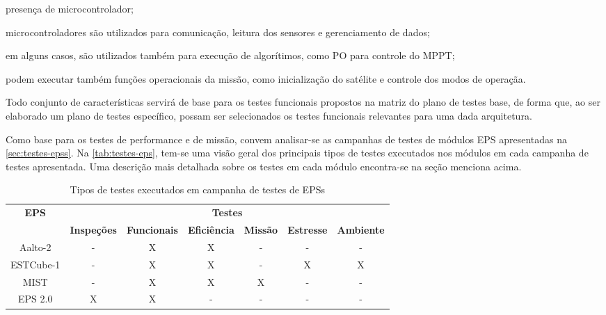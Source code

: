 \begin{alineas}
    \item presença de microcontrolador;
    \begin{alineas}
        \item microcontroladores são utilizados para comunicação, leitura dos sensores e gerenciamento de dados;
        \item em alguns casos, são utilizados também para execução de algorítimos, como \gls{PO} para controle do \gls{MPPT};
        \item podem executar também funções operacionais da missão, como inicialização do satélite e controle dos modos de operaçãa.
    \end{alineas}
\end{alineas}

Todo conjunto de características servirá de base para os testes funcionais propostos na matriz do plano de testes base, de forma que, ao ser elaborado um plano de testes específico, possam ser selecionados os testes funcionais relevantes para uma dada arquitetura.

Como base para os testes de performance e de missão, convem analisar-se as campanhas de testes de módulos \gls{EPS} apresentadas na \autoref{sec:testes-epss}.
Na \autoref{tab:testes-eps}, tem-se uma visão geral dos principais tipos de testes executados nos módulos em cada campanha de testes apresentada.
Uma descrição mais detalhada sobre os testes em cada módulo encontra-se na seção menciona acima.

\begin{table}[ht!]
    \ABNTEXfontereduzida
    \centering
    \caption{Tipos de testes executados em campanha de testes de EPSs}
    \begin{tabular}{ccccccc}
        \toprule
        \multirow{2}{*}{\textbf{EPS}} & \multicolumn{6}{c}{\textbf{Testes}} \\
        \cline{2-7}
        & \textbf{Inspeções} & \textbf{Funcionais} & \textbf{Eficiência} & \textbf{Missão} & \textbf{Estresse} & \textbf{Ambiente} \\
        \midrule
        \midrule
        Aalto-2   & - & X & X & - & - & - \\
        ESTCube-1 & - & X & X & - & X & X \\
        MIST      & - & X & X & X & - & - \\
        EPS 2.0   & X & X & - & - & - & - \\
        \bottomrule
    \end{tabular}
    \label{tab:testes-eps}
\end{table}


